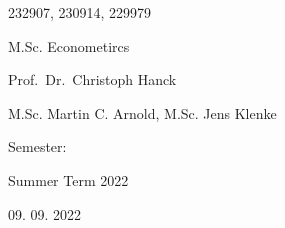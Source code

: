 \documentclass[11pt,a4paper]{article}
\begin{document}
\begin{titlepage}
  \noindent\begin{minipage}[t]{0.5\textwidth}
  \end{minipage}
  \begin{minipage}[t]{0.7\textwidth}
  \hspace{1cm}232907, 230914, 229979
  \end{minipage}

  \noindent\begin{minipage}[t]{0.5\textwidth}
  \end{minipage}
  \begin{minipage}[t]{0.7\textwidth}
  \hspace{1cm}M.Sc. Econometircs
  \end{minipage}

  \noindent\begin{minipage}[t]{0.5\textwidth}
  \end{minipage}
  \begin{minipage}[t]{0.7\textwidth}
  \hspace{1cm}Prof.~Dr.~Christoph Hanck
  \end{minipage}

  \noindent\begin{minipage}[t]{0.5\textwidth}
  \end{minipage}
  \begin{minipage}[t]{0.7\textwidth}
  \hspace{1cm}M.Sc. Martin C. Arnold, M.Sc. Jens Klenke
  \end{minipage}

  \noindent\begin{minipage}[t]{0.5\textwidth}
  Semester:
  \end{minipage}
  \begin{minipage}[t]{0.7\textwidth}
  \hspace{1cm}
  \end{minipage}

  \noindent\begin{minipage}[t]{0.5\textwidth}
  \end{minipage}
  \begin{minipage}[t]{0.7\textwidth}
  \hspace{1cm}Summer Term 2022
  \end{minipage}

  \noindent\begin{minipage}[t]{0.5\textwidth}
  \end{minipage}
  \begin{minipage}[t]{0.7\textwidth}
  \hspace{1cm}09. 09. 2022
  \end{minipage}

\end{titlepage}
\end{document}
